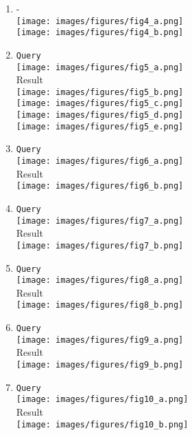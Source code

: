\documentclass[12pt,titlepage]{article}
\begin{document}
\begin{enumerate}
    \item - \\ \texttt{[image: images/figures/fig4\_a.png]} \\ \texttt{[image: images/figures/fig4\_b.png]}
    
    \newpage

    \item \texttt{Query} \\ \texttt{[image: images/figures/fig5\_a.png]} \\ Result \\ \texttt{[image: images/figures/fig5\_b.png]} \\ \texttt{[image: images/figures/fig5\_c.png]} \\ \texttt{[image: images/figures/fig5\_d.png]} \\ \texttt{[image: images/figures/fig5\_e.png]}
    \item \texttt{Query} \\ \texttt{[image: images/figures/fig6\_a.png]} \\ Result \\ \texttt{[image: images/figures/fig6\_b.png]}
    \item \texttt{Query} \\ \texttt{[image: images/figures/fig7\_a.png]} \\ Result \\ \texttt{[image: images/figures/fig7\_b.png]}
    \item \texttt{Query} \\ \texttt{[image: images/figures/fig8\_a.png]} \\ Result \\ \texttt{[image: images/figures/fig8\_b.png]}
    \item \texttt{Query} \\ \texttt{[image: images/figures/fig9\_a.png]} \\ Result \\ \texttt{[image: images/figures/fig9\_b.png]}
    \item \texttt{Query} \\ \texttt{[image: images/figures/fig10\_a.png]} \\ Result \\ \texttt{[image: images/figures/fig10\_b.png]}

\end{enumerate}
\end{document}
